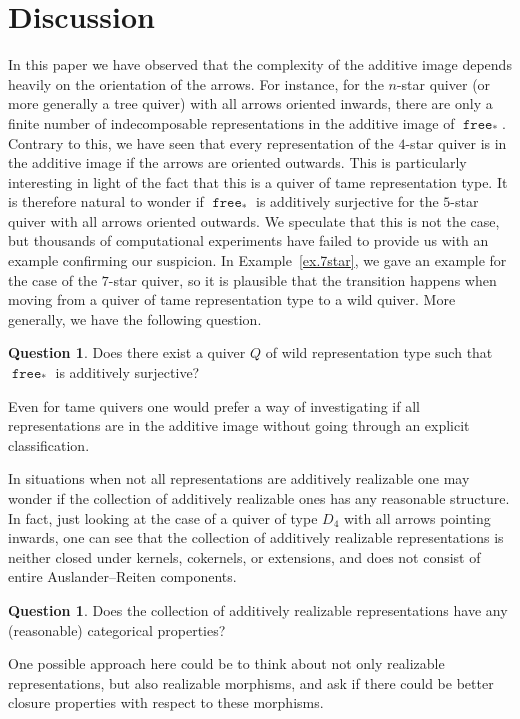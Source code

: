\documentclass[a4paper]{amsart}
\theoremstyle{plain}
\theoremstyle{definition}
\newtheorem{question}[theorem]{Question}
\theoremstyle{remark}
\newcommand{\funct}[1]{\operatorname{\mathtt{#1}}}
\begin{document}
\section{Discussion}
In this paper we have observed that the complexity of the additive image depends heavily on the orientation of the arrows. For instance, for the $n$-star quiver (or more generally a tree quiver) with all arrows oriented inwards, there are only a finite number of indecomposable representations in the additive image of $\funct{free}_*$. Contrary to this, we have seen that every representation of the $4$-star quiver is in the additive image if the arrows are oriented outwards. This is particularly interesting in light of the fact that this is a quiver of tame representation type. It is therefore natural to wonder if $\funct{free}_*$ is additively surjective for the $5$-star quiver with all arrows oriented outwards. We speculate that this is not the case, but thousands of computational experiments have failed to provide us with an example confirming our suspicion. In Example~\ref{ex.7star}, we gave an example for the case of the $7$-star quiver, so it is plausible that the transition happens when moving from a quiver of tame representation type to a wild quiver. More generally, we have the following question. 
\begin{question}
Does there exist a quiver $Q$ of wild representation type such that $\funct{free}_*$ is additively surjective?
\end{question}
Even for tame quivers one would prefer a way of investigating if all representations are in the additive image without going through an explicit classification.

\medskip
In situations when not all representations are additively realizable one may wonder if the collection of additively realizable ones has any reasonable structure. In fact, just looking at the case of a quiver of type \( D_4 \) with all arrows pointing inwards, one can see that the collection of additively realizable representations is neither closed under kernels, cokernels, or extensions, and does not consist of entire Auslander--Reiten components.
\begin{question}
Does the collection of additively realizable representations have any (reasonable) categorical properties?
\end{question}
One possible approach here could be to think about not only realizable representations, but also realizable morphisms, and ask if there could be better closure properties with respect to these morphisms.
\end{document}
